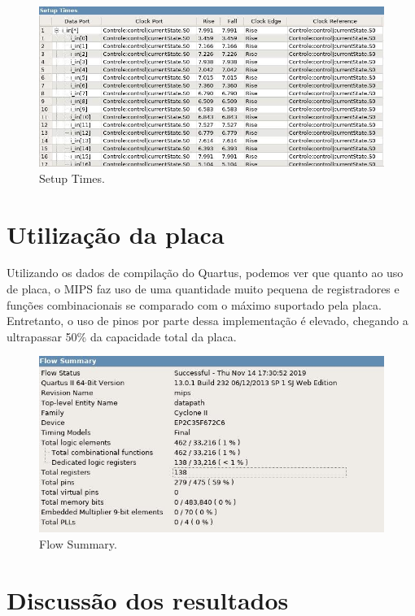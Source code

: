 \documentclass{article}
\begin{document}
        \begin{figure}[H]
            \centering
            \includegraphics[width=\textwidth]{setup_times.jpg}
            \caption{Setup Times.}
            \label{figura:mips}
        \end{figure}


    \section{Utilização da placa}

    Utilizando os dados de compilação do Quartus, podemos ver que quanto ao uso de placa, o MIPS
    faz uso de uma quantidade muito pequena de registradores e funções combinacionais se comparado
    com o máximo suportado pela placa. Entretanto, o uso de pinos por parte dessa implementação é 
    elevado, chegando a ultrapassar 50\% da capacidade total da placa.

    \begin{figure}[H]
        \centering
        \includegraphics[width=\textwidth]{flow_summary.jpg}
        \caption{Flow Summary.}
        \label{figura:mips}
    \end{figure}

    \section{Discussão dos resultados}
\end{document}

